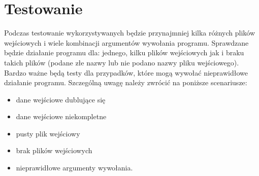 \documentclass[a4paper,11pt,notitlepage]{article}
\begin{document}
\section{Testowanie}

Podczas testowanie wykorzystywanych będzie przynajmniej kilka różnych plików wejściowych i wiele kombinacji argumentów wywołania programu. Sprawdzane będzie działanie programu dla: jednego, kilku plików wejściowych jak i braku takich plików (podane złe nazwy lub nie podano nazwy pliku wejściowego). Bardzo ważne będą testy dla przypadków, które mogą wywołać nieprawidłowe działanie programu. Szczególną uwagę należy zwrócić na poniższe scenariusze:
\begin{itemize}
 		\item dane wejściowe dublujące się
 		\item dane wejściowe niekompletne
 		\item pusty plik wejściowy
 		\item brak plików wejściowych
 		\item nieprawidłowe argumenty wywołania.
\end{itemize}
 
\end{document}
